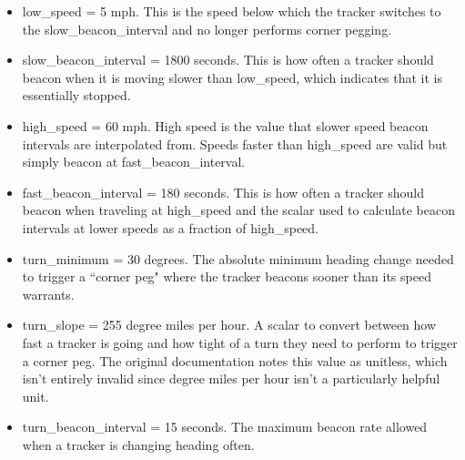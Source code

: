 \begin{itemize}
	\item low\_speed = 5 mph. This is the speed below which the tracker
		switches to the slow\_beacon\_interval 
		and no longer performs corner pegging.
	\item slow\_beacon\_interval = 1800 seconds. This is how often a tracker
		should beacon when it is moving slower than low\_speed, which indicates
		that it is essentially stopped.
	\item high\_speed = 60 mph. High speed is the value that slower speed
		beacon intervals are interpolated from. Speeds faster than high\_speed
		are valid but simply beacon at fast\_beacon\_interval.
	\item fast\_beacon\_interval = 180 seconds. This is how often a tracker should
		beacon when traveling at high\_speed and the scalar used to 
		calculate beacon intervals at lower speeds as a fraction of high\_speed.
	\item turn\_minimum = 30 degrees. The absolute minimum heading change needed 
		to trigger
		a ``corner peg" where the tracker beacons sooner than its speed warrants.
	\item turn\_slope = 255 degree miles per hour. 
		A scalar to convert between how fast a tracker is going and 
		how tight of a turn they need to perform to trigger a corner peg.
		The original documentation notes this value as unitless,
		which isn't entirely invalid since degree miles per hour isn't 
		a particularly helpful unit.
	\item turn\_beacon\_interval = 15 seconds. The maximum beacon rate allowed 
		when a tracker is changing heading often.
	
\end{itemize}

